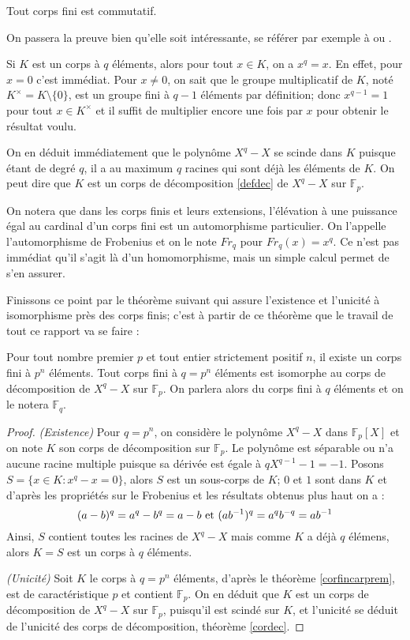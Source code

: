 \documentclass[a4paper]{article} %
\numberwithin{section}{part}
\numberwithin{equation}{section}
\newcommand\GF[1]{\mathbb{F}_{#1}}
\begin{document}
\begin{thm}[Wedderburn]
Tout corps fini est commutatif.
\end{thm}
On passera la preuve bien qu'elle soit intéressante, se référer par exemple à 
\cite[p.~70-73]{LiNi} ou \cite[p.~82]{Per}.\par
\vspace{0.3cm}
Si $K$ est un corps à $q$ éléments, alors pour tout $x\in K$, on a $x^q = x$. En
effet, pour $x = 0$ c'est immédiat. Pour $x\neq 0$, on sait que le groupe
multiplicatif de $K$, noté $K^{\times} = K\setminus\lbrace0\rbrace$, est un
groupe fini à $q-1$ éléments par définition; donc $x^{q-1} = 1$ pour tout $x\in
K^{\times}$ et il suffit de multiplier encore une fois par $x$ pour obtenir le
résultat voulu.\par
On en déduit immédiatement que le polynôme $X^q - X$ se scinde dans $K$
puisque étant de degré $q$, il a au maximum $q$ racines qui sont déjà les
éléments de $K$. On peut dire que $K$ est un corps de décomposition
\ref{defdec} de $X^q - X$ sur $\GF{p}$.\par
On notera que dans les corps finis et leurs extensions, l'élévation à une
puissance égal au cardinal d'un corps fini est un automorphisme particulier. On
l'appelle l'automorphisme de Frobenius et on le note $Fr_q$ pour $Fr_q(x) =
x^q$. Ce n'est pas immédiat qu'il s'agit là d'un homomorphisme, mais un simple
calcul permet de s'en assurer.\par
\vspace{0.3cm}
Finissons ce point par le théorème suivant qui assure l'existence et l'unicité
à isomorphisme près des corps finis; c'est à partir de ce théorème que le
travail de tout ce rapport va se faire :

\begin{thm}
\label{thisomGF}
Pour tout nombre premier $p$ et tout entier strictement positif $n$, il existe 
un corps fini à $p^n$ éléments. Tout corps fini à $q = p^n$ éléments est 
isomorphe au corps de décomposition de $X^q - X$ sur $\GF{p}$. On parlera alors 
du corps fini à $q$ éléments et on le notera $\GF{q}$.
\end{thm}
\begin{proof}
\textit{(Existence)} Pour $q = p^n$, on considère le polynôme $X^q - X$ dans 
$\GF{p}[X]$ et on note $K$ son corps de décomposition sur $\GF{p}$. Le polynôme 
est séparable ou n'a aucune racine multiple puisque sa dérivée est égale à 
$qX^{q-1} - 1 = -1$. Posons $S = \lbrace x\in K : x^q - x = 0\rbrace$, alors $S$
est un sous-corps de $K$; $0$ et $1$ sont dans $K$ et d'après les propriétés sur
le Frobenius et les résultats obtenus plus haut on a :
\[(a - b)^q = a^q - b^q = a - b \textup{ et }(ab^{-1})^q = a^qb^{-q} = ab^{-1}\]
Ainsi, $S$ contient toutes les racines de $X^q - X$ mais comme $K$ a déjà $q$
élémens, alors $K = S$ est un corps à $q$ éléments.\par
\textit{(Unicité)} Soit $K$ le corps à $q = p^n$ éléments, d'après le théorème
\ref{corfincarprem}, est de caractéristique $p$ et contient $\GF{p}$. On en
déduit que $K$ est un corps de décomposition de $X^q - X$ sur $\GF{p}$,
puisqu'il est scindé sur $K$, et l'unicité se déduit de l'unicité des corps de
décomposition, théorème \ref{cordec}.
\end{proof}
\end{document}
